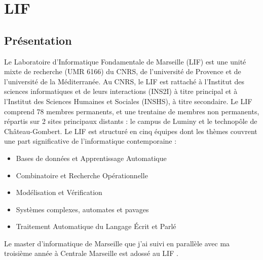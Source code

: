 \documentclass[a4paper]{report}
\begin{document}
\tableofcontents


\chapter{LIF}

\section{Présentation}

Le Laboratoire d'Informatique Fondamentale de Marseille (LIF) est une unité mixte de recherche (UMR 6166) du CNRS, de l'université de Provence et de l'université de la Méditerranée. Au CNRS, le LIF est rattaché à l'Institut des sciences informatiques et de leurs interactions (INS2I) à titre principal et à l'Institut des Sciences Humaines et Sociales (INSHS), à titre secondaire. Le LIF comprend 78 membres permanents, et une trentaine de membres non permanents, répartis sur 2 sites principaux distants : le campus de Luminy et le technopôle de Château-Gombert. Le LIF est structuré en cinq équipes dont les thèmes couvrent une part significative de l'informatique contemporaine :

\begin{itemize}
 \item Bases de données et Apprentissage Automatique
 \item Combinatoire et Recherche Opérationnelle
 \item Modélisation et Vérification
 \item Systèmes complexes, automates et pavages
 \item Traitement Automatique du Langage Écrit et Parlé
 
\end{itemize}


Le master d'informatique de Marseille que j'ai suivi en parallèle avec ma troisième année à Centrale Marseille est adossé au LIF .
\end{document}

